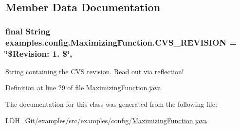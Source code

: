 \subsection{Member Data Documentation}
\hypertarget{classexamples_1_1config_1_1_maximizing_function_a38563017a5b93d5b3cdda6586910861b}{
\subsubsection[{C\-V\-S\-\_\-\-R\-E\-V\-I\-S\-I\-O\-N}]{\setlength{\rightskip}{0pt plus 5cm}final String examples.\-config.\-Maximizing\-Function.\-C\-V\-S\-\_\-\-R\-E\-V\-I\-S\-I\-O\-N = \char`\"{}\$Revision\-: 1. \$\char`\"{}\hspace{0.3cm}{\ttfamily [static]}, {\ttfamily [private]}}}\label{classexamples_1_1config_1_1_maximizing_function_a38563017a5b93d5b3cdda6586910861b}
String containing the C\-V\-S revision. Read out via reflection! 

Definition at line 29 of file Maximizing\-Function.\-java.



The documentation for this class was generated from the following file\-:\begin{DoxyCompactItemize}
\item 
L\-D\-H\-\_\-\-Git/examples/src/examples/config/\hyperlink{_maximizing_function_8java}{Maximizing\-Function.\-java}\end{DoxyCompactItemize}

